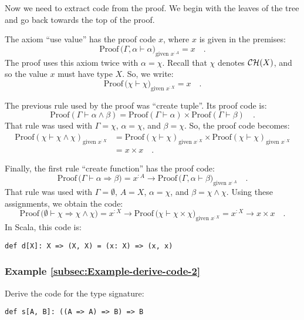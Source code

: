 Now we need to extract code from the proof. We begin with the leaves
of the tree and go back towards the top of the proof.

The axiom \textsf{``}use value\textsf{''} has the proof code $x$, where $x$ is given
in the premises:
\[
\text{Proof}\,\big(\Gamma,\alpha\vdash\alpha\big)_{\text{given }x^{:A}}=x\quad.
\]
The proof uses this axiom twice with $\alpha=\chi$. Recall that $\chi$
denotes ${\cal CH}(X)$, and so the value $x$ must have type $X$.
So, we write:
\[
\text{Proof}\,\big(\chi\vdash\chi\big)_{\text{given }x^{:X}}=x\quad.
\]

The previous rule used by the proof was \textsf{``}create tuple\textsf{''}. Its proof
code is:
\[
\text{Proof}\left(\Gamma\vdash\alpha\wedge\beta\right)=\text{Proof}\left(\Gamma\vdash\alpha\right)\times\text{Proof}\left(\Gamma\vdash\beta\right)\quad.
\]
That rule was used with $\Gamma=\chi$, $\alpha=\chi$, and $\beta=\chi$.
So, the proof code becomes:
\begin{align*}
\text{Proof}\left(\chi\vdash\chi\wedge\chi\right)_{\text{given }x^{:X}} & =\text{Proof}\left(\chi\vdash\chi\right)_{\text{given }x^{:X}}\times\text{Proof}\left(\chi\vdash\chi\right)_{\text{given }x^{:X}}\\
 & =x\times x\quad.
\end{align*}

Finally, the first rule \textsf{``}create function\textsf{''} has the proof code:
\[
\text{Proof}\,\big(\Gamma\vdash\alpha\Rightarrow\beta\big)=x^{:A}\rightarrow\text{Proof}\,\big(\Gamma,\alpha\vdash\beta\big)_{\text{given }x^{:A}}\quad.
\]
That rule was used with $\Gamma=\emptyset$, $A=X$, $\alpha=\chi$,
and $\beta=\chi\wedge\chi$. Using these assignments, we obtain the
code:
\[
\text{Proof}\,\big(\emptyset\vdash\chi\Rightarrow\chi\wedge\chi\big)=x^{:X}\rightarrow\text{Proof}\,\big(\chi\vdash\chi\times\chi\big)_{\text{given }x^{:X}}=x^{:X}\rightarrow x\times x\quad.
\]
In Scala, this code is:
\begin{lstlisting}
def d[X]: X => (X, X) = (x: X) => (x, x) 
\end{lstlisting}


\subsubsection{Example \label{subsec:Example-derive-code-2}\ref{subsec:Example-derive-code-2}}

Derive the code for the type signature:
\begin{lstlisting}
def s[A, B]: ((A => A) => B) => B
\end{lstlisting}


